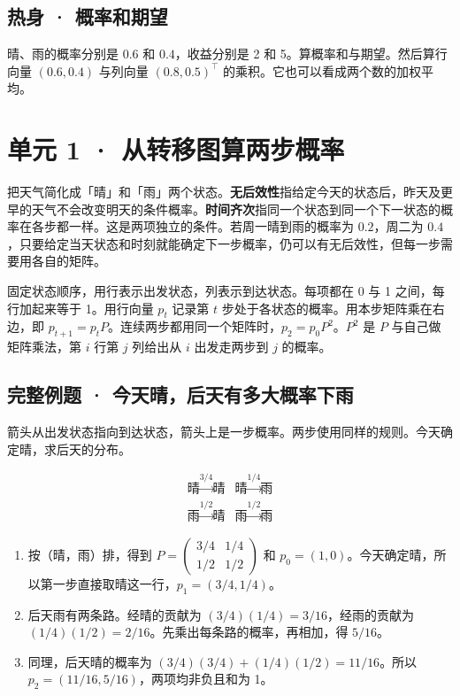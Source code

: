 \documentclass[UTF8,a4paper,11pt]{ctexart}
\begin{document}
\subsection{热身 · 概率和期望}
晴、雨的概率分别是 $0.6$ 和 $0.4$，收益分别是 2 和 5。算概率和与期望。然后算行向量 $(0.6,0.4)$ 与列向量 $(0.8,0.5)^\top$ 的乘积。它也可以看成两个数的加权平均。

\clearpage
\section{单元 1 · 从转移图算两步概率}
把天气简化成「晴」和「雨」两个状态。\textbf{无后效性}指给定今天的状态后，昨天及更早的天气不会改变明天的条件概率。\textbf{时间齐次}指同一个状态到同一个下一状态的概率在各步都一样。这是两项独立的条件。若周一晴到雨的概率为 $0.2$，周二为 $0.4$，只要给定当天状态和时刻就能确定下一步概率，仍可以有无后效性，但每一步需要用各自的矩阵。

固定状态顺序，用行表示出发状态，列表示到达状态。每项都在 0 与 1 之间，每行加起来等于 1。用行向量 $p_t$ 记录第 $t$ 步处于各状态的概率。用本步矩阵乘在右边，即 $p_{t+1}=p_tP$。连续两步都用同一个矩阵时，$p_2=p_0P^2$。$P^2$ 是 $P$ 与自己做矩阵乘法，第 $i$ 行第 $j$ 列给出从 $i$ 出发走两步到 $j$ 的概率。

\subsection{完整例题 · 今天晴，后天有多大概率下雨}
箭头从出发状态指向到达状态，箭头上是一步概率。两步使用同样的规则。今天确定晴，求后天的分布。

\[\begin{array}{ll}
\text{晴}\xrightarrow{3/4}\text{晴} & \text{晴}\xrightarrow{1/4}\text{雨}\\
\text{雨}\xrightarrow{1/2}\text{晴} & \text{雨}\xrightarrow{1/2}\text{雨}
\end{array}\]
\begin{enumerate}
\item 按（晴，雨）排，得到 $P=\begin{pmatrix}3/4&1/4\\1/2&1/2\end{pmatrix}$ 和 $p_0=(1,0)$。今天确定晴，所以第一步直接取晴这一行，$p_1=(3/4,1/4)$。
\item 后天雨有两条路。经晴的贡献为 $(3/4)(1/4)=3/16$，经雨的贡献为 $(1/4)(1/2)=2/16$。先乘出每条路的概率，再相加，得 $5/16$。
\item 同理，后天晴的概率为 $(3/4)(3/4)+(1/4)(1/2)=11/16$。所以 $p_2=(11/16,5/16)$，两项均非负且和为 1。
\end{enumerate}
\end{document}
